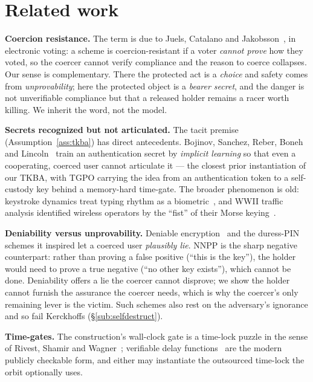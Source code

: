 \section{Related work}
\label{sec:related}

\textbf{Coercion resistance.} The term is due to Juels, Catalano and
Jakobsson~\cite{juels-coercion}, in electronic voting: a scheme is
coercion-resistant if a voter \emph{cannot prove} how they voted, so the coercer
cannot verify compliance and the reason to coerce collapses. Our sense is
complementary. There the protected act is a \emph{choice} and safety comes from
\emph{unprovability}; here the protected object is a \emph{bearer secret}, and the
danger is not unverifiable compliance but that a released holder remains a racer
worth killing. We inherit the word, not the model.

\textbf{Secrets recognized but not articulated.} The tacit premise
(Assumption~\ref{ass:tkba}) has direct antecedents. Bojinov, Sanchez, Reber, Boneh
and Lincoln~\cite{bojinov-rubberhose} train an authentication secret by
\emph{implicit learning} so that even a cooperating, coerced user cannot
articulate it --- the closest prior instantiation of our TKBA, with TGPO carrying
the idea from an authentication token to a self-custody key behind a memory-hard
time-gate. The broader phenomenon is old: keystroke dynamics treat typing rhythm
as a biometric~\cite{monrose-keystroke}, and WWII traffic analysis identified
wireless operators by the ``fist'' of their Morse keying~\cite{kahn-codebreakers}.

\textbf{Deniability versus unprovability.} Deniable
encryption~\cite{canetti-deniable} and the duress-PIN schemes it inspired let a
coerced user \emph{plausibly lie}. NNPP is the sharp negative counterpart: rather
than proving a false positive (``this is the key''), the holder would need to prove
a true negative (``no other key exists''), which cannot be done. Deniability offers
a lie the coercer cannot disprove; we show the holder cannot furnish the assurance
the coercer needs, which is why the coercer's only remaining lever is the victim.
Such schemes also rest on the adversary's ignorance and so fail Kerckhoffs
(\S\ref{sub:selfdestruct}).

\textbf{Time-gates.} The construction's wall-clock gate is a time-lock puzzle in
the sense of Rivest, Shamir and Wagner~\cite{rsw1996}; verifiable delay
functions~\cite{boneh-vdf} are the modern publicly checkable form, and either may
instantiate the outsourced time-lock the orbit optionally uses.

